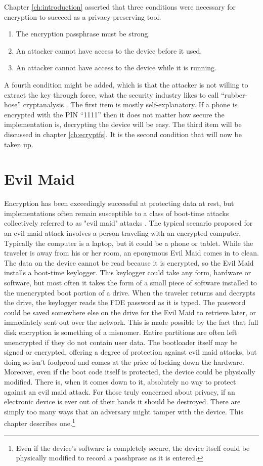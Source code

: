Chapter \ref{ch:introduction} asserted that three conditions were necessary for encryption to succeed as a privacy-preserving tool.
\begin{enumerate}
	\item{The encryption passphrase must be strong.}
	\item{An attacker cannot have access to the device before it used.}
	\item{An attacker cannot have access to the device while it is running.}
\end{enumerate}
A fourth condition might be added, which is that the attacker is not willing to extract the key through force, what the security
industry likes to call ``rubber-hose'' cryptanalysis \cite{rubberhose}.  The first item is mostly self-explanatory. If a phone is
encrypted with the PIN ``1111'' then it does not matter how secure the implementation is, decrypting the device will be easy. The
third item will be discussed in chapter \ref{ch:ecryptfs}.  It is the second condition that will now be taken up. 

\section{Evil Maid}
Encryption has been exceedingly successful at protecting data at rest, but implementations often remain susceptible to a class of
boot-time attacks collectively referred to as "evil maid" attacks \cite{schneiermaid}. The typical scenario proposed for an evil
maid attack involves a person traveling with an encrypted computer. Typically the computer is a laptop, but it could be a phone or
tablet.  While the traveler is away from his or her room, an eponymous Evil Maid comes in to clean. The data on the device cannot be
read because it is encrypted, so the Evil Maid installs a boot-time keylogger. This keylogger could take any form, hardware or
software, but most often it takes the form of a small piece of software installed to the unencrypted boot portion of a drive. When
the traveler returns and decrypts the drive, the keylogger reads the FDE password as it is typed. The password could be saved
somewhere else on the drive for the Evil Maid to retrieve later, or immediately sent out over the network.  This is made possible by
the fact that full disk encryption is something of a misnomer.  Entire partitions are often left unencrypted if they do not contain
user data.  The bootloader itself may be signed or encrypted, offering a degree of protection against evil maid attacks, but doing
so isn't foolproof \cite{attackingbitlocker} and comes at the price of locking down the hardware. Moreover, even if the boot code
itself is protected, the device could be physically modified. There is, when it comes down to it, absolutely no way to protect
against an evil maid attack.  For those truly concerned about privacy, if an electronic device is ever out of their hands it should
be destroyed. There are simply too many ways that an adversary might tamper with the device. This chapter describes
one.\footnote{Even if the device's software is completely secure, the device itself could be physically modified to record a
passhprase as it is entered.}

